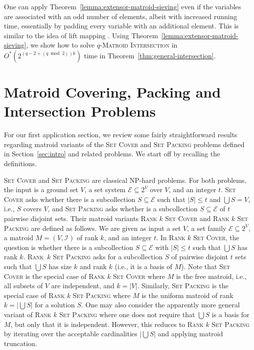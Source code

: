 \documentclass[10pt,a4paper]{article}
\newcommand{\cI}{\ensuremath{\mathcal I}\xspace}
\newcommand{\cE}{\ensuremath{\mathcal E}\xspace}
\begin{document}
One can apply Theorem~\ref{lemma:extensor-matroid-sieving} even if the variables are associated with an odd number of elements, albeit with increased running time, essentially by padding every variable with an additional element.
This is similar to the idea of lift mapping \cite{BrandDH18}.
Using Theorem~\ref{lemma:extensor-matroid-sieving}, we show how to solve \textsc{$q$-Matroid Intersection} in $O^*(2^{(q-2+(q \bmod 2))k})$ time in Theorem~\ref{thm:general-intersection}.

\section{Matroid Covering, Packing and Intersection Problems}
\label{sec:matroid-applications}

For our first application section, we review some fairly
straightforward results regarding matroid variants of the
\textsc{Set Cover} and \textsc{Set Packing} problems defined in Section~\ref{sec:intro} and related problems.
We start off by recalling the definitions.

\textsc{Set Cover} and \textsc{Set Packing} are classical NP-hard problems.
For both problems, the input is a ground set $V$, a set system $\cE \subseteq 2^V$ over $V$, and an integer $t$.
\textsc{Set Cover} asks whether there is a
subcollection $S \subseteq \cE$ such that $|S| \le t$ and $\bigcup S=V$,
i.e., $S$ covers $V$, and
\textsc{Set Packing} asks whether is a subcollection $S \subseteq \cE$ of $t$ pairwise disjoint sets.
Their matroid variants \textsc{Rank $k$ Set Cover} and \textsc{Rank $k$ Set Packing} are defined as follows.
We are given as input a set $V$, a set family $\cE \subseteq 2^V$, a matroid $M = (V, \cI)$ of rank $k$, and an integer $t$.
In \textsc{Rank $k$ Set Cover}, the question is whether there is a subcollection $S \subseteq \cE$ with $|S| \le t$ such that  $\bigcup S$ has rank $k$.
\textsc{Rank~$k$ Set Packing} asks for a subcollection $S$ of pairwise disjoint $t$ sets such that $\bigcup S$ has size $k$ and rank $k$ (i.e., it is a basis of $M$).
Note that \textsc{Set Cover} is the special case of \textsc{Rank $k$ Set Cover} where $M$ is the free matroid, i.e., all subsets of $V$ are independent, and $k = |V|$.
Similarly, \textsc{Set Packing} is the special case of \textsc{Rank $k$ Set Packing} where $M$ is the uniform matroid of rank $k = |\bigcup S|$ for a solution $S$.
One may also consider the apparently more general variant of \textsc{Rank $k$ Set Packing} where one does not require that $\bigcup S$ is a basis for $M$, but only that it is independent. 
However, this reduces to \textsc{Rank $k$ Set Packing} by iterating over the acceptable cardinalities $|\bigcup S|$ and applying matroid truncation.
\end{document}
